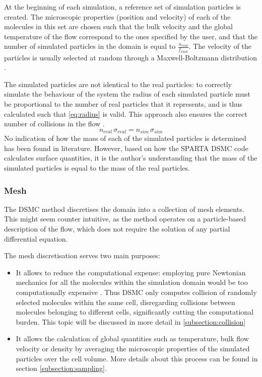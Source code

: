 At the beginning of each simulation, a reference set of simulation particles is created. The microscopic properties (position and velocity) of each of the molecules in this set are chosen such that the bulk velocity and the global temperature of the flow correspond to the ones specified by the user, and that the number of simulated particles in the domain is equal to $\frac{n_{real}}{f_{num}}$. The velocity of the particles is usually selected at random through a Maxwell-Boltzmann distribution \cite{natodsmc}.

The simulated particles are not identical to the real particles: to correctly simulate the behaviour of the system the radius of each simulated particle must be proportional to the number of real particles that it represents, and is thus calculated such that \autoref{eq:radius} is valid. This approach also ensures the correct number of collisions in the flow \cite{dsmcnotes}.
\begin{equation}
    n_{real}\, \sigma_{real} = n_{sim}\, \sigma_{sim}
    \label{eq:radius}
\end{equation}
No indication of how the mass of each of the simulated particles is determined has been found in literature. However, based on how the SPARTA DSMC code calculates surface quantities, it is the author's understanding that the mass of the simulated particles is equal to the mass of the real particles.

\subsubsection{Mesh}
The DSMC method discretises the domain into a collection of mesh elements. This might seem counter intuitive, as the method operates on a particle-based description of the flow, which does not require the solution of any partial differential equation.

The mesh discretisation serves two main purposes: 

\begin{itemize}
    \item It allows to reduce the computational expense: employing pure Newtonian mechanics for all the molecules within the simulation domain would be too computationally expensive \cite{themontecarlo}. Thus DSMC only computes collision of randomly selected molecules within the same cell, disregarding collisions between molecules belonging to different cells, significantly cutting the computational burden. This topic will be discussed in more detail in \autoref{subsection:collision}
    \item It allows the calculation of global quantities such as temperature, bulk flow velocity or density by averaging the microscopic properties of the simulated particles over the cell volume. More details about this process can be found in section \autoref{subsection:sampling}.
\end{itemize}

